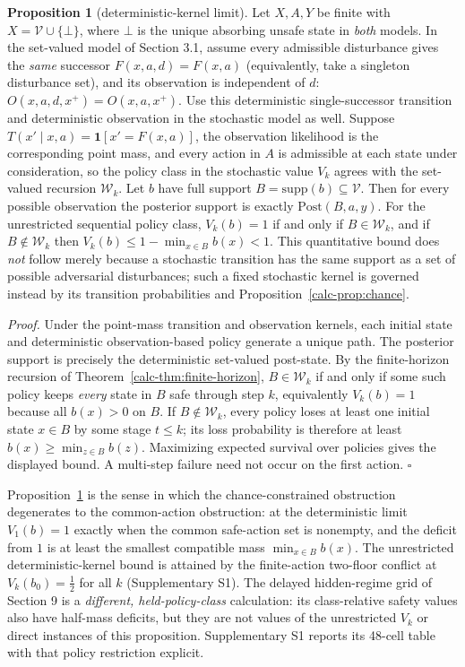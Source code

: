 \documentclass[10pt,twocolumn]{article}
\theoremstyle{definition}
\newtheorem{proposition}{Proposition}
\begin{document}
\begin{proposition}[deterministic-kernel limit]\label{calc-prop:degenerate}
Let \(X,A,Y\) be finite with \(X=\mathcal V\cup\{\bot\}\), where
\(\bot\) is the unique absorbing unsafe state in \emph{both} models.
In the set-valued model of Section 3.1, assume every admissible
disturbance gives the \emph{same} successor
\(F(x,a,d)=F(x,a)\) (equivalently, take a singleton disturbance set),
and its observation is independent of \(d\):
\(O(x,a,d,x^{+})=O(x,a,x^{+})\). Use this deterministic
single-successor transition and deterministic observation in the
stochastic model as well. Suppose
\(T(x'\mid x,a)=\mathbf{1}[x'=F(x,a)]\), the observation likelihood is
the corresponding point mass, and every action in \(A\) is admissible
at each state under consideration, so the policy class in the stochastic
value \(V_k\) agrees with the set-valued recursion \(\mathcal W_k\).
Let \(b\) have full support \(B=\mathrm{supp}(b)\subseteq\mathcal V\).
Then for every possible observation the posterior support is exactly
\(\mathrm{Post}(B,a,y)\). For the unrestricted sequential policy class,
\(V_k(b)=1\) if and only if \(B\in\mathcal W_k\), and if
\(B\notin\mathcal W_k\) then
\(V_k(b)\le 1-\min_{x\in B}b(x)<1\).
This quantitative bound does \emph{not} follow merely because a
stochastic transition has the same support as a set of possible
adversarial disturbances; such a fixed stochastic kernel is governed
instead by its transition probabilities and Proposition~\ref{calc-prop:chance}.
\end{proposition}

\emph{Proof.} Under the point-mass transition and observation kernels,
each initial state and deterministic observation-based policy generate a
unique path. The posterior support is precisely the deterministic
set-valued post-state. By the finite-horizon recursion of
Theorem~\ref{calc-thm:finite-horizon}, \(B\in\mathcal W_k\) if and only if
some such policy keeps \emph{every} state in \(B\) safe through step
\(k\), equivalently \(V_k(b)=1\) because all \(b(x)>0\) on \(B\).
If \(B\notin\mathcal W_k\), every policy loses at least one initial
state \(x\in B\) by some stage \(t\le k\); its loss probability is
therefore at least \(b(x)\ge\min_{z\in B}b(z)\). Maximizing expected
survival over policies gives the displayed bound. A multi-step failure
need not occur on the first action. \hfill\(\square\)

Proposition~\ref{calc-prop:degenerate} is the sense in which the chance-constrained obstruction degenerates to the common-action obstruction: at the deterministic limit \(V_{1}(b) = 1\) exactly when the common safe-action set is nonempty, and the deficit from \(1\) is at least the smallest compatible mass \(\min_{x \in B} b(x)\). The unrestricted deterministic-kernel bound is attained by the finite-action two-floor conflict at \(V_k(b_0)=\tfrac12\) for all \(k\) (Supplementary S1). The delayed hidden-regime grid of Section 9 is a \emph{different, held-policy-class} calculation: its class-relative safety values also have half-mass deficits, but they are not values of the unrestricted \(V_k\) or direct instances of this proposition. Supplementary S1 reports its 48-cell table with that policy restriction explicit.
\end{document}

